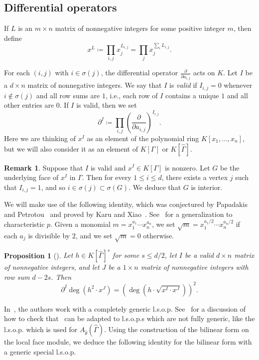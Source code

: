 \documentclass[11pt]{article}
\newtheorem{prop}[theo]{Proposition}
\theoremstyle{definition}
\newtheorem{rema}[theo]{Remark}
\numberwithin{equation}{section}
\numberwithin{equation}{section}
\begin{document}
\subsection{Differential operators}

If $L$ is an $m \times n$ matrix of nonnegative integers for some positive integer $m$, then define 
\[ x^L \coloneqq \prod_{i,j} x_j^{L_{i,j}} = \prod_j x_j^{\sum_i L_{i,j}}.\] 

For each $(i, j)$ with $i \in \sigma(j)$, 
the differential operator $\frac{\partial}{\partial a_{i,j}}$ acts on $K$. 
Let $I$ be a $d \times n$ matrix of nonnegative integers. We say that $I$ is \emph{valid} if $I_{i,j} = 0$ whenever $i \not \in \sigma(j)$ and 
all row sums are $1$, i.e.,
each row of $I$ contains a unique $1$ and all other entries are $0$. If $I$ is valid, then we set
$$\partial^I \coloneqq \prod_{i,j} \left(\frac{\partial}{\partial a_{i,j}}\right)^{I_{i,j}}.$$
Here we are thinking of $x^I$ as an element of the polynomial ring $K[x_1, \dotsc, x_n]$, but we will also consider it as an element of $K[\Gamma]$ or $K[\hat{\Gamma}]$. 

\begin{rema}\label{rem:validunderlyingsupport}
	Suppose that $I$ is valid and $x^I \in K[\Gamma]$ is nonzero. Let $G$  be the underlying face of $x^I$ in $\Gamma$. Then for every $1 \le i \le d$, there exists a vertex $j$ such that $I_{i,j} = 1$, and so $i \in \sigma(j) \subset \sigma(G)$. We deduce that $G$ is interior. 
\end{rema}

We will make use of the following identity, which was conjectured by Papadakis and Petrotou~\cite{PapadakisPetrotoug} and proved by Karu and Xiao~\cite{KaruXiao}. See~\cite[Corollary~3.1]{KLS} for a generalization to characteristic $p$. 
Given a monomial $m = x_1^{a_1} \dotsb x_n^{a_n}$, we 
set $\sqrt{m} = x_1^{a_1/2} \dotsb x_n^{a_n/2}$ if each $a_j$ is divisible by $2$, and we set $\sqrt{m} = 0$ otherwise.

\begin{prop}[{\cite[Corollary 4.2]{KaruXiao}}]\label{prop:KXidentity}
Let $h \in K[\hat{\Gamma}]^{s}$ for some $s \le d/2$, 
let $I$ be a valid $d \times n$ matrix of nonnegative integers, and   let $J$ be a $1 \times n$  matrix of nonnegative integers  with row sum $d - 2s$.
Then
$$\partial^I \deg(h^2 \cdot x^J) =  (\deg (h\cdot \sqrt{x^I \cdot x^J}))^2.$$
\end{prop}

In~\cite{KaruXiao}, the authors work with a completely generic l.s.o.p. See~\cite[Corollary 2.10]{LNS} for a discussion of how to check that~\cite[Corollary 4.2]{KaruXiao} can be adapted to l.s.o.p.s which are not fully generic, like the l.s.o.p. which is used for $A_{\hat{\theta}}(\hat{\Gamma})$.  
Using the construction of the bilinear form on the local face module, we deduce the following identity for the bilinear form with a generic special l.s.o.p. 
\end{document}

